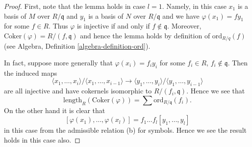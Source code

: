 \begin{proof}
First, note that the lemma holds in case $l = 1$.
Namely, in this case $x_1$ is a basis of $M$ over $R/\mathfrak q$
and $y_1$ is a basis of $N$ over $R/\mathfrak q$ and we have
$\varphi(x_1) = fy_1$ for some $f \in R$. Thus $\varphi$ is injective
if and only if $f \not \in \mathfrak q$. Moreover,
$\text{Coker}(\varphi) = R/(f, \mathfrak q)$ and hence the lemma
holds by definition of $\text{ord}_{R/q}(f)$
(see Algebra, Definition \ref{algebra-definition-ord}).

\medskip\noindent
In fact, suppose more generally that $\varphi(x_i) = f_iy_i$ for some
$f_i \in R$, $f_i \not \in \mathfrak q$. Then the induced maps
$$
\langle x_1, \ldots, x_i\rangle / \langle x_1, \ldots, x_{i - 1}\rangle
\longrightarrow
\langle y_1, \ldots, y_i\rangle / \langle y_1, \ldots, y_{i - 1}\rangle
$$
are all injective and have cokernels isomorphic to
$R/(f_i, \mathfrak q)$. Hence we see that
$$
\text{length}_R(\text{Coker}(\varphi)) = \sum \text{ord}_{R/\mathfrak q}(f_i).
$$
On the other hand it is clear that
$$
[\varphi(x_1), \ldots, \varphi(x_l)] = f_1 \ldots f_l [y_1, \ldots, y_l]
$$
in this case from the admissible relation (b) for symbols.
Hence we see the result holds in this case also.


\end{proof}
